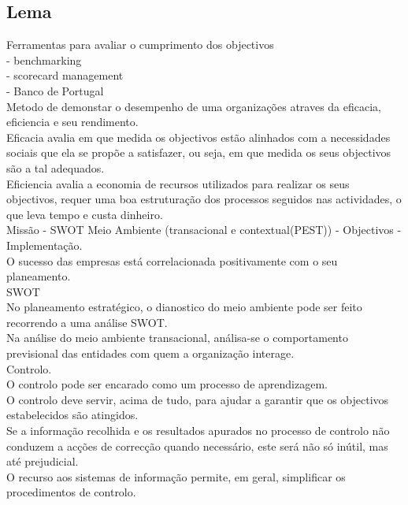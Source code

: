 \subsection{Lema}


Ferramentas para avaliar o cumprimento dos objectivos\\
- benchmarking\\
- scorecard management\\
- Banco de Portugal\\

Metodo de demonstar o desempenho de uma organizações atraves da eficacia, eficiencia e seu rendimento.\\

Eficacia avalia em que medida os objectivos estão alinhados com a necessidades sociais que ela se propõe a satisfazer, ou seja, em que medida os seus objectivos são a tal adequados.\\

Eficiencia avalia a economia de recursos utilizados para realizar os seus objectivos, requer uma boa estruturação dos processos seguidos nas actividades, o que leva tempo e custa dinheiro.\\

Missão - SWOT Meio Ambiente (transacional e contextual(PEST)) - Objectivos - Implementação.\\

O sucesso das empresas está correlacionada positivamente com o seu planeamento.\\

SWOT\\

No planeamento estratégico, o dianostico do meio ambiente pode ser feito recorrendo a uma análise SWOT.\\

Na análise do meio ambiente transacional, análisa-se o comportamento previsional das entidades com quem a organização interage.\\

Controlo.\\
O controlo pode ser encarado como um processo de aprendizagem.\\
O controlo deve servir, acima de tudo, para ajudar a garantir que os objectivos estabelecidos são atingidos.\\
Se a informação recolhida e os resultados apurados no processo de controlo não conduzem a acções de correcção quando necessário, este será não só inútil, mas até prejudicial.\\
O recurso aos sistemas de informação permite, em geral, simplificar os procedimentos de controlo.\\

